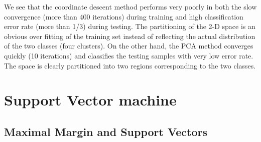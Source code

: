 \documentclass{article}
\begin{document}
We see that the coordinate descent method performs very poorly in both
the slow convergence (more than 400 iterations) during training and high 
classification error rate (more than 1/3) during testing. The partitioning 
of the 2-D space is an obvious over fitting of the training set instead of
reflecting the actual distribution of the two classes (four clusters). On 
the other hand, the PCA method converges quickly (10 iterations) and 
classifies the testing samples with very low error rate. The space is 
clearly partitioned into two regions corresponding to the two classes.





\section{Support Vector machine}




\subsection{Maximal Margin and Support Vectors}




\end{document}
